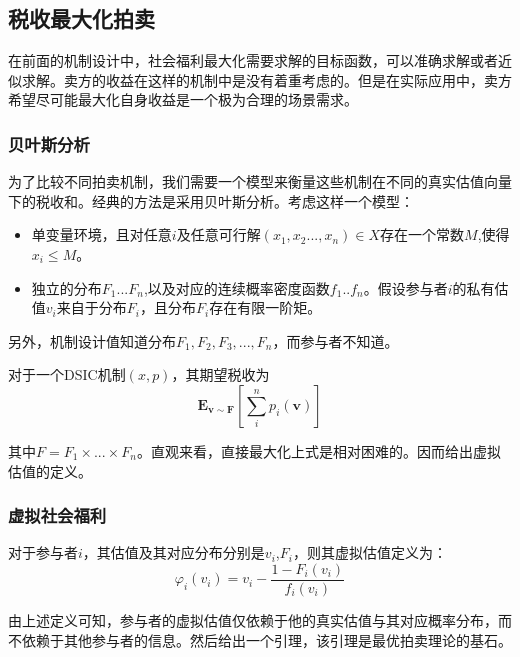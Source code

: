 \documentclass[promaster]{thesis-uestc}
\begin{document}
\subsection{税收最大化拍卖}
在前面的机制设计中，社会福利最大化需要求解的目标函数，可以准确求解或者近似求解。卖方的收益在这样的机制中是没有着重考虑的。但是在实际应用中，卖方希望尽可能最大化自身收益是一个极为合理的场景需求。

\subsubsection{贝叶斯分析}
为了比较不同拍卖机制，我们需要一个模型来衡量这些机制在不同的真实估值向量下的税收和。经典的方法是采用贝叶斯分析。考虑这样一个模型：

\begin{itemize}
    \item 单变量环境，且对任意$i$及任意可行解$(x_1,x_2...,x_n)\in X$存在一个常数$M$,使得$x_i\leq M$。
    \item 独立的分布$F_1...F_n$,以及对应的连续概率密度函数$f_1..f_n$。假设参与者$i$的私有估值$v_i$来自于分布$F_i$，且分布$F_i$存在有限一阶矩。
\end{itemize}

另外，机制设计值知道分布$F_1,F_2,F_3,...,F_n$，而参与者不知道。

\begin{definition}[期望税收]
对于一个DSIC机制$(x,p)$，其期望税收为
   \begin{equation}
    \mathbf{E}_{\mathbf{v}\sim\mathbf{F}}{\left[\sum_{i}^{n}{p_i(\mathbf{v})}\right]}
    \end{equation}
\end{definition}

其中$F=F_1\times...\times F_n$。直观来看，直接最大化上式是相对困难的。因而给出虚拟估值的定义。

\subsubsection{虚拟社会福利}

\begin{definition}[虚拟估值]
    对于参与者$i$，其估值及其对应分布分别是$v_i$,$F_i$，则其虚拟估值定义为：
    \begin{equation}
     \varphi_i(v_i) = v_i - \frac{1-F_i(v_i)}{f_i(v_i)}   
    \end{equation}
\end{definition}

由上述定义可知，参与者的虚拟估值仅依赖于他的真实估值与其对应概率分布，而不依赖于其他参与者的信息。然后给出一个引理，该引理是最优拍卖理论的基石。
\end{document}
